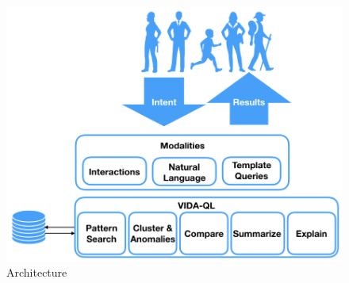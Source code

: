 \begin{figure}
\centering
\includegraphics[width=\linewidth]{figures/VIDA_architecture.png}
\vspace{-10pt}
\caption{\vida Architecture\label{fig:vida_architecture}
\vspace{-15pt}
}
\end{figure}






